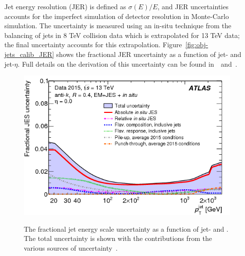 Jet energy resolution (JER) is defined as $\sigma(E)/E$, and JER uncertainties
accounts for the imperfect simulation of detector resolution in Monte-Carlo simulation.
The uncertainty is measured using an in-situ technique from the balancing of jets in 8 TeV collision data
which is extrapolated for 13 TeV data; the final uncertainty accounts for this extrapolation.
Figure~\ref{fig:obj-jets_calib_JER} shows the fractional JER uncertainty as a function of jet-\pT{} and jet-$\eta$.
Full details on the derivation of this uncertainty can be found in~\cite{obj-jets_calib_2015}~and~\cite{obj-jets_calib_JER_8TeV}.

\begin{figure}[!htb]
  \begin{center}
    \captionsetup[subfigure]{aboveskip=0pt,justification=centering}
     {\includegraphics[width=0.4\linewidth, angle=0]{figs/Objects/jets_uncert_JES_pt.png} }
  \end{center}
 \vspace{-1em}
  \caption[The fractional jet energy scale uncertainty as a function of jet-\pT{} and \eta.]
          { \label{fig:obj-jets_calib_JES} The fractional jet energy scale uncertainty as a function of jet-\pT{} and \eta.
            The total uncertainty is shown with the contributions from the various sources of uncertainty~\cite{obj-jets_calib_run2}.}
 \vspace{0.2em}
  \begin{center}      
    \captionsetup[subfigure]{aboveskip=0pt,justification=centering}

\end{center}
\end{figure}
